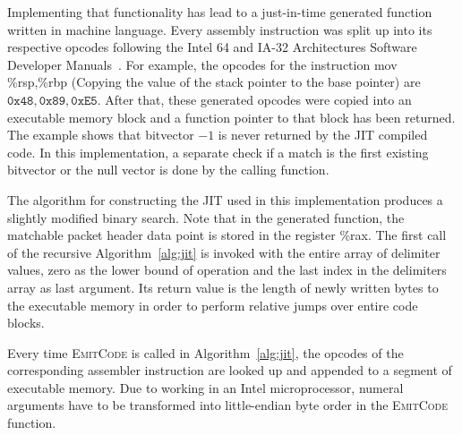 \documentclass[conference]{IEEEtran}
\begin{document}
Implementing that functionality has lead to a just-in-time generated function written in machine 
language.
Every assembly instruction was split up into its respective opcodes following the 
Intel 64 and IA-32 Architectures Software Developer Manuals~\cite{intelsys}.
For example, the opcodes for the instruction 
\textsf{mov \%rsp,\%rbp} (Copying the value of the stack pointer to the base pointer) 
are $\texttt{0x48}, \texttt{0x89}, \texttt{0xE5}$.
After that, these generated opcodes were copied into an executable memory block and a function pointer to that block has been returned.
The example shows that bitvector $-1$ is never returned by the JIT compiled code.
In this implementation, a separate check if a match is the first existing bitvector or the null 
vector is done by the calling function.

The algorithm for constructing the JIT used in this implementation produces a slightly modified binary search.
Note that in the generated function, the matchable packet header data point is stored in the register \textsf{\%rax}.
The first call of the recursive Algorithm~\ref{alg:jit} is invoked with the entire array of delimiter values,
zero as the lower bound of operation and the last index in the delimiters array as last argument.
Its return value is the length of newly written bytes to the executable memory in order to perform relative jumps over entire code blocks.

Every time \textsc{EmitCode} is called in Algorithm~\ref{alg:jit}, the opcodes 
of the corresponding assembler instruction are looked up and appended to a segment of executable memory.
Due to working in an Intel microprocessor, numeral arguments have to be 
transformed into little-endian byte order in the \textsc{EmitCode} function.
\end{document}
